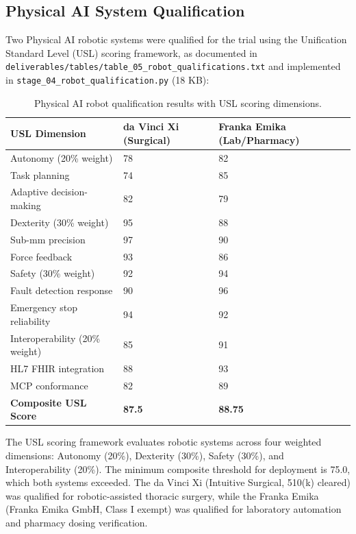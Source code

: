 \documentclass{article}
\begin{document}
\subsection{Physical AI System Qualification}

Two Physical AI robotic systems were qualified for the trial using the Unification Standard Level (USL) scoring framework, as documented in \texttt{deliverables/tables/table\_05\_robot\_qualifications.txt} and implemented in \texttt{stage\_04\_robot\_qualification.py} (18 KB):

\begin{table}[H]
\centering
\caption{Physical AI robot qualification results with USL scoring dimensions.}
\label{tab:robot-qual}
\small
\begin{tabularx}{\textwidth}{@{}L{4cm}C{3cm}C{3cm}@{}}
\toprule
\textbf{USL Dimension} & \textbf{da Vinci Xi (Surgical)} & \textbf{Franka Emika (Lab/Pharmacy)} \\
\midrule
Autonomy (20\% weight) & 78 & 82 \\
\hspace{0.3cm}Task planning & 74 & 85 \\
\hspace{0.3cm}Adaptive decision-making & 82 & 79 \\
Dexterity (30\% weight) & 95 & 88 \\
\hspace{0.3cm}Sub-mm precision & 97 & 90 \\
\hspace{0.3cm}Force feedback & 93 & 86 \\
Safety (30\% weight) & 92 & 94 \\
\hspace{0.3cm}Fault detection response & 90 & 96 \\
\hspace{0.3cm}Emergency stop reliability & 94 & 92 \\
Interoperability (20\% weight) & 85 & 91 \\
\hspace{0.3cm}HL7 FHIR integration & 88 & 93 \\
\hspace{0.3cm}MCP conformance & 82 & 89 \\
\midrule
\textbf{Composite USL Score} & \textbf{87.5} & \textbf{88.75} \\
\bottomrule
\end{tabularx}
\end{table}

The USL scoring framework evaluates robotic systems across four weighted dimensions: Autonomy (20\%), Dexterity (30\%), Safety (30\%), and Interoperability (20\%). The minimum composite threshold for deployment is 75.0, which both systems exceeded. The da Vinci Xi (Intuitive Surgical, 510(k) cleared) was qualified for robotic-assisted thoracic surgery, while the Franka Emika (Franka Emika GmbH, Class I exempt) was qualified for laboratory automation and pharmacy dosing verification.
\end{document}

